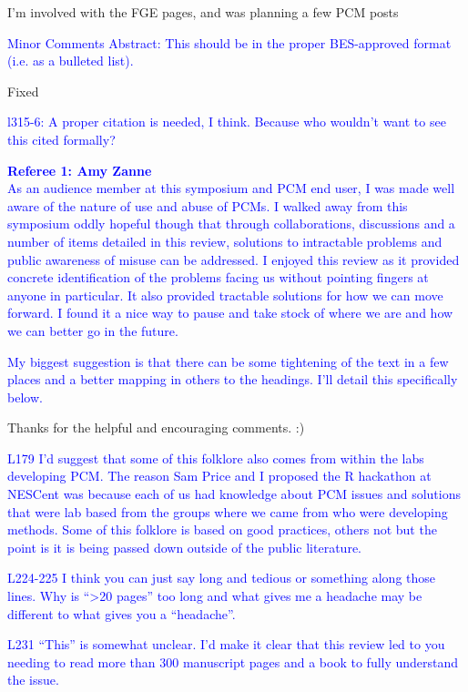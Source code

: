 \documentclass[12pt]{letter}
\begin{document}
\begin{letter}{}
I'm involved with the FGE pages, and was planning a few PCM posts 

\textcolor{blue}{Minor Comments
Abstract: This should be in the proper BES-approved format (i.e. as a bulleted list).}

Fixed

\textcolor{blue}{l315-6: A proper citation is needed, I think. Because who wouldn't want to see this cited formally?}

\textcolor{blue}{\textbf{Referee 1: Amy Zanne}}\\

\textcolor{blue}{As an audience member at this symposium and PCM end user, I was made well aware of the nature of use and abuse of PCMs. I walked away from this symposium oddly hopeful though that through collaborations, discussions and a number of items detailed in this review, solutions to intractable problems and public awareness of misuse can be addressed. I enjoyed this review as it provided concrete identification of the problems facing us without pointing fingers at anyone in particular. It also provided tractable solutions for how we can move forward. I found it a nice way to pause and take stock of where we are and how we can better go in the future.}

\textcolor{blue}{My biggest suggestion is that there can be some tightening of the text in a few places and a better mapping in others to the headings. I’ll detail this specifically below.}

Thanks for the helpful and encouraging comments. :)

\textcolor{blue}{L179 I’d suggest that some of this folklore also comes from within the labs developing PCM. The reason Sam Price and I proposed the R hackathon at NESCent was because each of us had knowledge about PCM issues and solutions that were lab based from the groups where we came from who were developing methods. Some of this folklore is based on good practices, others not but the point is it is being passed down outside of the public literature.}

\textcolor{blue}{L224-225 I think you can just say long and tedious or something along those lines. Why is “>20 pages” too long and what gives me a headache may be different to what gives you a “headache”.}

\textcolor{blue}{L231 “This” is somewhat unclear. I’d make it clear that this review led to you needing to read more than 300 manuscript pages and a book to fully understand the issue.}


\end{letter}
\end{document}
